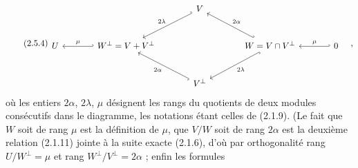 \begin{equation}\tag{2.5.4}
\begin{tikzcd}[column sep=large, row sep=large]
& & V \arrow[dl, hook', "2\lambda"'] & & \\
U & W^{\perp} = V + V^{\perp} \arrow[l, hook', "\mu"'] & & W = V \cap V^{\perp} \arrow[ul, hook', "2\alpha"'] \arrow[dl, hook, "2\lambda"] & 0 \arrow[l, hook', "\mu"'] \\
& & V^{\perp} \arrow[ul, hook, "2\alpha"] & &
\end{tikzcd} \quad ,
\end{equation}
où les entiers $2\alpha$, $2\lambda$, $\mu$ désignent les rangs du quotients de deux modules consécutifs dans le diagramme, les notations étant celles de (2.1.9). (Le fait que $W$ soit de rang $\mu$ est la définition de $\mu$, que $V/W$ soit de rang $2\alpha$ est la deuxième relation (2.1.11) jointe à la suite exacte (2.1.6), d'où par orthogonalité rang $U/W^{\perp} = \mu$ et rang $W^{\perp}/V^{\perp} = 2\alpha$ ; enfin les formules

